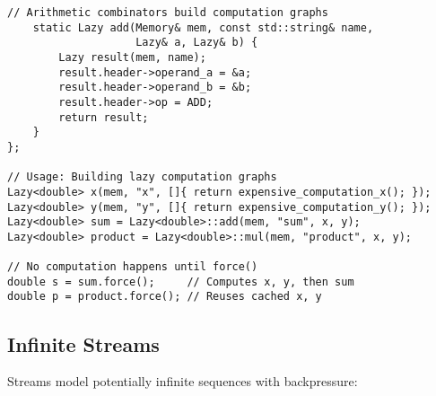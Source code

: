 \documentclass[11pt]{article}
\begin{document}
\begin{lstlisting}[caption={Lazy Computation with Arithmetic Combinators}]
    // Arithmetic combinators build computation graphs
    static Lazy add(Memory& mem, const std::string& name,
                    Lazy& a, Lazy& b) {
        Lazy result(mem, name);
        result.header->operand_a = &a;
        result.header->operand_b = &b;
        result.header->op = ADD;
        return result;
    }
};

// Usage: Building lazy computation graphs
Lazy<double> x(mem, "x", []{ return expensive_computation_x(); });
Lazy<double> y(mem, "y", []{ return expensive_computation_y(); });
Lazy<double> sum = Lazy<double>::add(mem, "sum", x, y);
Lazy<double> product = Lazy<double>::mul(mem, "product", x, y);

// No computation happens until force()
double s = sum.force();     // Computes x, y, then sum
double p = product.force(); // Reuses cached x, y
\end{lstlisting}

\subsection{Infinite Streams}

Streams model potentially infinite sequences with backpressure:
\end{document}
